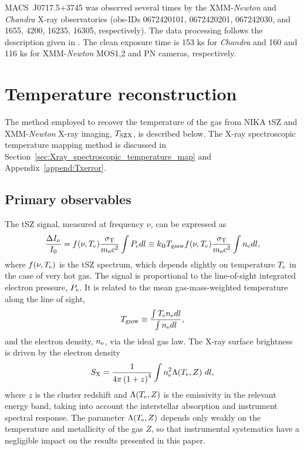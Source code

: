 \documentclass[twocolumn,traditabstract]{aa}
\def\TSZ {T_{\rm SZX}}
\def\TMW {T_{\rm gmw}}
\begin{document}
\mbox{MACS~J0717.5+3745} was observed several times by the XMM-\textit{Newton} and \textit{Chandra} X-ray observatories (obs-IDs 0672420101, 0672420201, 067242030, and 1655, 4200, 16235, 16305, respectively). The data processing follows the description given in \cite{Adam2016b}. The clean exposure time is 153 ks for \textit{Chandra} and 160 and 116 ks for XMM-\textit{Newton} MOS1,2 and PN cameras, respectively.

\section{Temperature reconstruction}\label{sec:method}
The method employed to recover the temperature of the gas from NIKA tSZ and XMM-\textit{Newton} X-ray imaging, $\TSZ$, is described below. The X-ray spectroscopic temperature mapping method is discussed in Section~\ref{sec:Xray_spectroscopic_temperature_map} and Appendix~\ref{append:Txerror}.

\subsection{Primary observables}
The tSZ signal, measured at frequency $\nu$, can be expressed as
\begin{equation}
        \frac{\Delta I_{\nu}}{I_0} = f(\nu, T_{\rm e}) \frac{\sigma_{\rm T}}{m_{\rm e} c^2} \int P_{\rm e} dl \equiv k_{\rm B} \TMW f(\nu, T_{\rm e}) \frac{\sigma_{\rm T}}{m_{\rm e} c^2} \int n_{\rm e} dl,
\label{eq:dIsz}
\end{equation}
where $f(\nu, T_{\rm e})$ is the tSZ spectrum, which depends slightly on temperature $T_{\rm e}$ in the case of very hot gas. The signal is proportional to the line-of-sight integrated electron pressure, $P_{\rm e}$. It is related to the mean gas-mass-weighted temperature along the line of sight, 
\begin{equation}
       \TMW  \equiv \frac{\int T_{\rm e} n_{\rm e} dl}{\int n_{\rm e} dl},
        \label{eq:Tgmw_def}
\end{equation}
and the electron density, $n_{\rm e}$, via the ideal gas law. The X-ray surface brightness is driven by the electron density
\begin{equation}
        S_{\rm X}= \frac{1}{4 \pi \left(1+z\right)^4} \int n_{\rm e}^2 \Lambda(T_{\rm e}, Z) \ dl,
        \label{eq:sx}
\end{equation}
where $z$ is the cluster redshift and $\Lambda(T_{\rm e}, Z)$ is the emissivity in the relevant energy band, taking into account the interstellar absorption and instrument spectral response. The parameter $\Lambda(T_{\rm e}, Z)$ depends only weakly on the temperature and metallicity of the gas $Z$, so that instrumental systematics have a negligible impact on the results presented in this paper.
\end{document}
